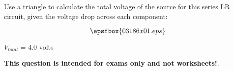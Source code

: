 

Use a triangle to calculate the total voltage of the source for this series LR circuit, given the voltage drop across each component:

$$\epsfbox{03186x01.eps}$$







$V_{total}$ = 4.0 volts







{\bf This question is intended for exams only and not worksheets!}.




